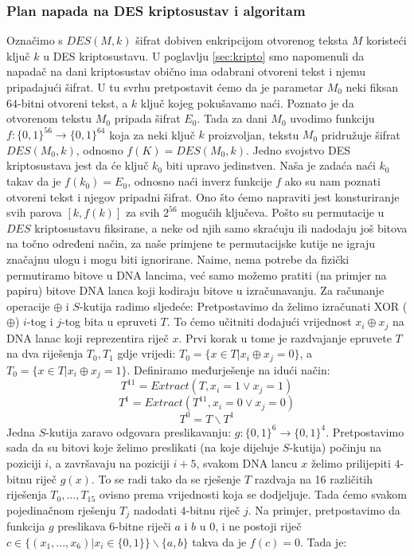 \documentclass[a4paper,oneside,12pt]{memoir} %
\begin{document}
\begin{spacing}{1.5}
\subsubsection{Plan napada na DES kriptosustav i algoritam}
Označimo s $DES(M,k)$ šifrat dobiven enkripcijom otvorenog teksta $M$ koristeći ključ $k$ u DES kriptosustavu. U poglavlju \ref{sec:kripto} smo napomenuli da napadač na dani kriptosustav obično ima odabrani otvoreni tekst i njemu pripadajući šifrat. U tu svrhu pretpostavit ćemo da je parametar $M_0$ neki fiksan $64$-bitni otvoreni tekst, a $k$ ključ kojeg pokušavamo naći. Poznato je da otvorenom tekstu $M_0$ pripada šifrat $E_0$. Tada za dani $M_0$ uvodimo funkciju $f:\{0,1\}^{56} \to \{0,1\}^{64}$ koja za neki ključ $k$ proizvoljan, tekstu $M_0$ pridružuje šifrat $DES(M_0,k)$, odnosno $f(K)=DES(M_0,k)$. Jedno svojstvo DES kriptosustava jest da će ključ $k_0$ biti upravo jedinstven. Naša je zadaća naći $k_0$ takav da je $f(k_0)=E_0$, odnosno naći inverz funkcije $f$ ako su nam poznati otvoreni tekst i njegov pripadni šifrat. Ono što ćemo napraviti jest konsturiranje svih parova $[k, f(k)]$ za svih $2^{56}$ mogućih ključeva. Pošto su permutacije u $DES$ kriptosustavu fiksirane, a neke od njih samo skraćuju ili nadodaju još bitova na točno određeni način, za naše primjene te permutacijske kutije ne igraju značajnu ulogu i mogu biti ignorirane. Naime, nema potrebe da  fizički permutiramo bitove u DNA lancima, već samo možemo pratiti (na primjer na papiru) bitove DNA lanca koji kodiraju bitove u izračunavanju. Za računanje operacije $\oplus$ i $S$-kutija radimo sljedeće:
Pretpostavimo da želimo izračunati XOR ($\oplus$) $i$-tog i $j$-tog bita u epruveti $T$. To ćemo učitniti dodajući vrijednost $x_i \oplus x_j$ na DNA lanac koji reprezentira riječ $x$. Prvi korak u tome je razdvajanje epruvete $T$ na dva riješenja $T_0, T_1$ gdje vrijedi:
$T_0=\{x \in T| x_i \oplus x_j=0 \}$, a $T_0=\{x \in T| x_i \oplus x_j=1 \}$. Definiramo međurješenje na idući način:
\[T^{11}=Extract(T, x_i=1 \vee x_j=1)\]
\[T^{1}=Extract(T^{11}, x_i=0 \vee x_j=0)\]
\[T^{0}=T\backslash T^{1}\]
Jedna $S$-kutija zaravo odgovara preslikavanju: $g: \{0,1\}^6 \to \{0,1\}^4$. Pretpostavimo sada da su bitovi koje želimo preslikati (na koje dijeluje $S$-kutija) počinju na poziciji $i$, a završavaju na poziciji $i+5$, svakom DNA lancu $x$ želimo prilijepiti $4$-bitnu riječ  $g(x)$. To se radi tako da se rješenje $T$ razdvaja na 16 različitih riješenja $T_0,...,T_{15}$ ovisno prema vrijednosti koja se dodjeljuje. Tada ćemo svakom pojedinačnom rješenju $T_j$ nadodati $4$-bitnu riječ $j$. Na primjer, pretpostavimo da funkcija $g$ preslikava $6$-bitne riječi $a$ i $b$ u $0$, i ne postoji riječ $c \in \{(x_1,...,x_6)| x_i \in \{0,1\}\}\backslash \{a,b\}$ takva da je $f(c)=0$. Tada je:

\end{spacing}
\end{document}
